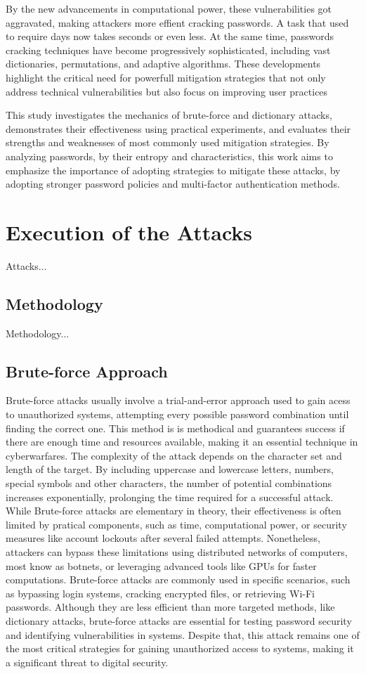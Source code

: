 \documentclass{comjnl}
\begin{document}
By the new advancements in computational power, these vulnerabilities got aggravated, making attackers more effient cracking passwords. A task that used to require days now takes seconds or even less. At the same time, passwords cracking techniques have become progressively sophisticated, including vast dictionaries, permutations, and adaptive algorithms. These developments highlight the critical need for powerfull mitigation strategies that not only address technical vulnerabilities but also focus on improving user practices 

This study investigates the mechanics of brute-force and dictionary attacks, demonstrates their effectiveness using practical experiments, and evaluates their strengths and weaknesses of most commonly used mitigation strategies. By analyzing passwords, by their entropy and characteristics, this work aims to emphasize the importance of adopting strategies to mitigate these attacks, by adopting stronger password policies and multi-factor authentication methods.

\section{Execution of the Attacks}

Attacks... 

\subsection{Methodology}

Methodology...
\subsection{Brute-force Approach}
Brute-force attacks usually involve a trial-and-error approach used to gain acess to unauthorized systems, attempting every possible password combination until finding the correct one. This method is  is methodical and guarantees success if there are enough time and resources available, making it an essential technique in cyberwarfares. The complexity of the attack depends on the character set and length of the target. By including uppercase and lowercase letters, numbers, special symbols and other characters, the number of potential combinations increases exponentially, prolonging the time required for a successful attack.  While Brute-force attacks are elementary in theory, their effectiveness is often limited by pratical components, such as time, computational power, or security measures like account lockouts after several failed attempts. Nonetheless, attackers can bypass these limitations using distributed networks of computers, most know as botnets, or leveraging advanced tools like GPUs for faster computations. Brute-force attacks are commonly used in specific scenarios, such as bypassing login systems, cracking encrypted files, or retrieving Wi-Fi passwords. Although they are less efficient than more targeted methods, like dictionary attacks, brute-force attacks are essential for testing password security and identifying vulnerabilities in systems. Despite that, this attack remains one of the most critical strategies for gaining unauthorized access to systems, making it a significant threat to digital security.
\end{document}

